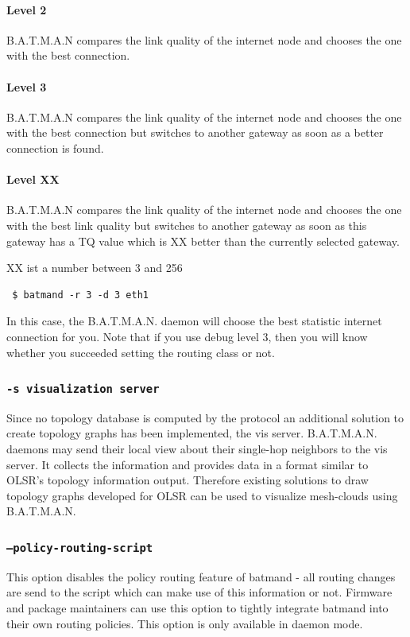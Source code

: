 \documentclass[
	12pt,
	a4paper,
	twoside,
	english,
	headsepline,
	footnosepline,
	automark,
	normalheadings,
	openany,
	cleardoubleplain,
	abstracton,
	idxtotoc,
	liststotoc,
	bibtotoc,
 	BCOR8mm,
]{scrartcl}
\newcommand{\subsubsectionttt}[1]{\subsubsection{\texttt{#1}}}
\begin{document}
\paragraph*{Level 2}
B.A.T.M.A.N compares the link quality of the internet node and chooses the one
with the best connection.

\paragraph*{Level 3}
B.A.T.M.A.N compares the link quality of the internet node and chooses the one
with the best connection but switches to another gateway as soon as a better
connection is found.

\paragraph*{Level XX}
B.A.T.M.A.N compares the link quality of the internet node and chooses the one
with the best link quality but switches to another gateway as soon as this
gateway has a TQ value which is XX better than the currently selected gateway.

XX ist a number between 3 and 256

\begin{verbatim}
 $ batmand -r 3 -d 3 eth1
\end{verbatim}
In this case, the B.A.T.M.A.N. daemon will choose the best statistic internet
connection for you. Note that if you use debug level 3, then you will know
whether you succeeded setting the routing class or not.

\subsubsectionttt{-s visualization server}
Since no topology database is computed by the protocol an additional solution to
create topology graphs has been implemented, the vis server. B.A.T.M.A.N.
daemons may send their local view about their single-hop neighbors to the vis
server. It collects the information and provides data in a format similar to
OLSR's topology information output. Therefore existing solutions to draw
topology graphs developed for OLSR can be used to visualize mesh-clouds
using B.A.T.M.A.N.

\subsubsectionttt{--policy-routing-script}
This option disables the policy routing feature of batmand - all routing changes
are send to the script which can make use of this information or not. Firmware
and package maintainers can use this option to tightly integrate batmand into
their own routing policies. This option is only available in daemon mode.
\end{document}
